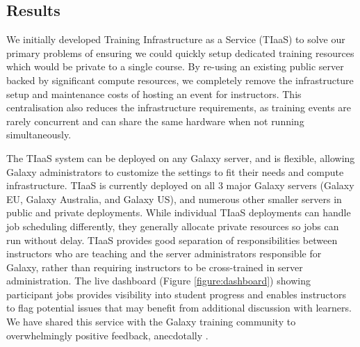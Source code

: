 \documentclass[a4paper,num-refs]{oup-contemporary}
\begin{document}
\subsection{Results}

We initially developed Training Infrastructure as a Service (TIaaS) to solve our primary problems of ensuring we could quickly setup dedicated training resources which would be private to a single course. By re-using an existing public server backed by significant compute resources, we completely remove the infrastructure setup and maintenance costs of hosting an event for instructors. This centralisation also reduces the infrastructure requirements, as training events are rarely concurrent and can share the same hardware when not running simultaneously. 

The TIaaS system can be deployed on any Galaxy server, and is flexible, allowing Galaxy administrators to customize the settings to fit their needs and compute infrastructure. TIaaS is currently deployed on all 3 major Galaxy servers (Galaxy EU, Galaxy Australia, and Galaxy US), and numerous other smaller servers in public and private deployments. While individual TIaaS deployments can handle job scheduling differently, they generally allocate private resources so jobs can run without delay. TIaaS provides good separation of responsibilities between instructors who are teaching and the server administrators responsible for Galaxy, rather than requiring instructors to be cross-trained in server administration. The live dashboard (Figure \ref{figure:dashboard}) showing participant jobs provides visibility into student progress and enables instructors to flag potential issues that may benefit from additional discussion with learners. We have shared this service with the Galaxy training community to overwhelmingly positive feedback, anecdotally \cite{tiaas_feedback}.
\end{document}
